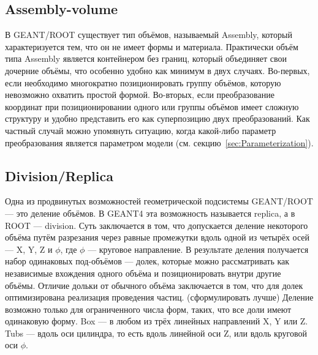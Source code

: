 \subsection{Assembly-volume}

В GEANT/ROOT существует тип объёмов, называемый Assembly, который характеризуется тем, что он не имеет формы и материала. Практически объём типа Assembly является контейнером без границ, который объединяет свои дочерние объёмы, что особенно удобно как минимум в двух случаях. Во-первых, если необходимо многократно позиционировать группу объёмов, которую невозможно охватить простой формой. Во-вторых, если преобразование координат при позиционировании одного или группы объёмов имеет сложную структуру и удобно представить его как суперпозицию двух преобразований. Как частный случай можно упомянуть ситуацию, когда какой-либо параметр преобразования является параметром модели (см. секцию~\ref{sec:Parameterization}).

\subsection{Division/Replica}

Одна из продвинутых возможностей геометрической подсистемы GEANT/ROOT --- это деление объёмов. В GEANT4 эта возможность называется replica, а в ROOT --- division. Суть заключается в том, что допускается деление некоторого объёма путём разрезания через равные промежутки вдоль одной из четырёх осей --- X, Y, Z и $\phi$, где $\phi$ --- круговое направление. В результате деления получается набор одинаковых под-объёмов --- долек, которые можно рассматривать как независимые вхождения одного объёма и позиционировать внутри другие объёмы. Отличие дольки от обычного объёма заключается в том, что для долек оптимизирована реализация проведения частиц. (\todo сформулировать лучше) Деление возможно только для ограниченного числа форм, таких, что все доли имеют одинаковую форму. Box --- в любом из трёх линейных направлений X, Y или Z. Tubs --- вдоль оси цилиндра, то есть вдоль линейной оси Z, или вдоль круговой оси $\phi$.

%                           

